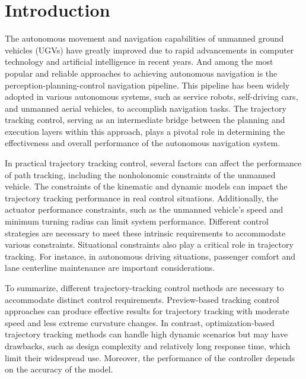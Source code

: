 \documentclass[sn-mathphys]{sn-jnl}%
\theoremstyle{thmstyleone}%
\theoremstyle{thmstyletwo}%
\theoremstyle{thmstylethree}%
\begin{document}


\section{Introduction}\label{sec1}

The autonomous movement and navigation capabilities of unmanned ground vehicles (UGVs) have greatly improved due to rapid advancements in computer technology and artificial intelligence in recent years. And among the most popular and reliable approaches to achieving autonomous navigation is the perception-planning-control navigation pipeline\cite{b.ravikiranDeepReinforcementLearning2021}. This pipeline has been widely adopted in various autonomous systems, such as service robots, self-driving cars, and unmanned aerial vehicles, to accomplish navigation tasks. The trajectory tracking control, serving as an intermediate bridge between the planning and execution layers within this approach, plays a pivotal role in determining the effectiveness and overall performance of the autonomous navigation system.


In practical trajectory tracking control, several factors can affect the performance of path tracking, including the nonholonomic constraints of the unmanned vehicle. The constraints of the kinematic and dynamic models can impact the trajectory tracking performance in real control situations. Additionally, the actuator performance constraints, such as the unmanned vehicle's speed and minimum turning radius can limit system performance. Different control strategies are necessary to meet these intrinsic requirements to accommodate various constraints. Situational constraints also play a critical role in trajectory tracking. For instance, in autonomous driving situations, passenger comfort and lane centerline maintenance are important considerations.

To summarize, different trajectory-tracking control methods are necessary to accommodate distinct control requirements. Preview-based tracking control approaches can produce effective results for trajectory tracking with moderate speed and less extreme curvature changes. In contrast, optimization-based trajectory tracking methods can handle high dynamic scenarios but may have drawbacks, such as design complexity and relatively long response time, which limit their widespread use. Moreover, the performance of the controller depends on the accuracy of the model.
\end{document}
